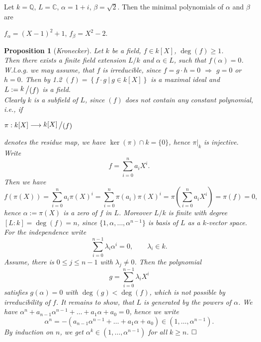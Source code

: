 \documentclass[11pt]{book}
\newtheorem{proposition}[theorem]{Proposition}
\theoremstyle{nonumberbreak}
\newenvironment{pr}[1][]{\ifthenelse{\equal{#1}{}}{\proof}{\proof[#1]}\rm}{\endproof}
\newenvironment{ex}[1][]{\ifthenelse{\equal{#1}{}}{\example}{\example[#1]}\rm}{\endexample}
\newcommand{\slant}[2]{{\raisebox{.1em}{$#1$}\left/\raisebox{-.1em}{$#2$}\right.}}
\begin{document}
\begin{spacing}{1.3}
\begin{ex}   %
Let $k=\mathbb{Q}$, $L=\mathbb{C}$, $\alpha=1+i$, $\beta = \sqrt{2}$. Then the minimal polynomials of $\alpha$ and $\beta$ are
\begin{center}$f_{\alpha}=\left(X-1\right)^2+1$, \textrm{  } $f_{\beta}=X^2-2$.\end{center}
\end{ex}

\begin{proposition}[\rm \it Kronecker]   %
Let $k$ be a field, $f \in k[X]$, $\deg(f)\geqslant 1$.\\
Then there exists a finite field extension $L/k$ and $\alpha \in L$, such that $f(\alpha)=0$.
\begin{pr}
W.l.o.g. we may assume, that $f$ is irreducible, since $f=g \cdot h =0$ $\Rightarrow$ $g=0$ or $h=0$. Then by 1.2 $( f )= \left\{f \cdot g \ \big \vert \ g \in k[X]\right\}$ is a maximal ideal and $L:=\slant{k}{( f )}$ is a field.\\
Clearly $k$ is a subfield of $L$, since $( f)$ does not contain any constant polynomial, i.e., if 
\begin{center}$ \pi: k[X] \longrightarrow \slant{k[X]}{( f )}$\end{center}
denotes the residue map, we have $\ker(\pi) \cap k=\{0\}$, hence $\pi|_{k}$ is injective.
Write $$f=\sum_{i=0}^n a_i X^{i}.$$ Then we have
$$f\left(\pi(X)\right)=\sum_{i=0}^n a_i \pi(X)^{i}= \sum_{i=0}^{n}\pi(a_i) \pi(X)^{i}=\pi \left(\sum_{i=0}^n a_i X^{i}\right) = \pi(f)=0,$$
hence $\alpha:=\pi(X)$ is a zero of $f$ in $L$.
Moreover $L/k$ is finite with degree $[L:k]=\deg(f)=n$, since $\{1,\alpha, \dots ,\alpha^{n-1}\}$ is basis of $L$ as a $k$-vector space.
For the independence write $$\sum_{i=0}^{n-1} \lambda_i \alpha^{i}=0, \qquad \lambda_i \in k.$$Assume, there is $0\leqslant j \leqslant n-1$ with $\lambda_j \neq 0$. Then the polynomial $$g=\sum_{i=0}^{n-1} \lambda_i X^{i}$$ satisfies $g(\alpha)=0$ with $\deg(g)<\deg(f)$, which is not possible by irreducibility of $f$.
It remains to show, that $L$ is generated by the powers of $\alpha$. We have $\alpha^n+a_{n-1}\alpha^{n-1}+ \dots +a_1 \alpha+a_0 = 0$, hence we write 
$$\alpha^n=-\left(a_{n-1}\alpha^{n-1}+ \dots + a_1 \alpha + a_0\right) \in ( 1, \dots , \alpha^{n-1}).$$
By induction on $n$, we get $\alpha^k \in ( 1, \dots , \alpha^{n-1})$ for all $k \geqslant n$. $\hfill \Box$
\end{pr}
\end{proposition}


\end{spacing}
\end{document}
